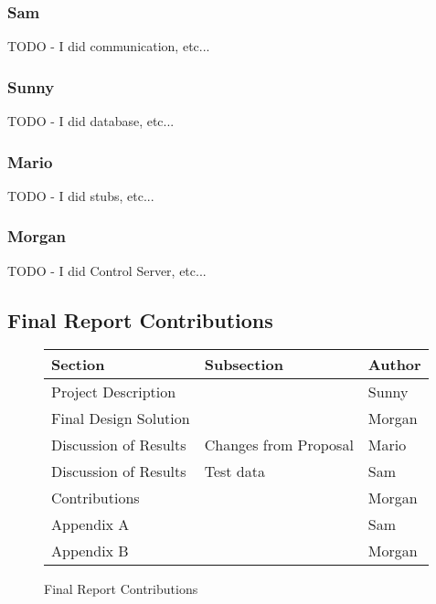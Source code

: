 \subsubsection{Sam}
TODO
- I did communication, etc...
\subsubsection{Sunny}
TODO
- I did database, etc...
\subsubsection{Mario}
TODO
- I did stubs, etc...
\subsubsection{Morgan}
TODO
- I did Control Server, etc...

\subsection{Final Report Contributions}

\begin{figure}[!htb]
\centering
\begin{tabular}{lll}
Section               & Subsection            & Author\\
\hline
Project Description   &                       & Sunny\\
Final Design Solution &                       & Morgan\\
Discussion of Results & Changes from Proposal & Mario\\
Discussion of Results & Test data             & Sam\\
Contributions         &                       & Morgan\\
Appendix A            &                       & Sam\\
Appendix B            &                       & Morgan\\
\end{tabular}
\caption{Final Report Contributions}
\label{fig:final-report-contributions}
\end{figure}
